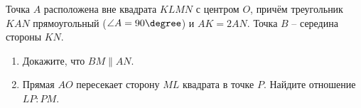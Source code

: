 \begin{ex}
	\begin{condition}
		Точка \( A  \) расположена вне квадрата \( KLMN  \) с центром \( O \), причём треугольник \( KAN  \) прямоугольный (\( \angle A = 90\degree \)) и \( AK = 2AN \). Точка \( B \) – середина стороны \( KN \).
		\begin{enumerate}
			\item Докажите, что \( BM \parallel AN \).
			\item Прямая \( AO  \) пересекает сторону \( ML  \) квадрата в точке \( P \). Найдите отношение \( LP : PM \).
		\end{enumerate}
	\end{condition}
\end{ex}